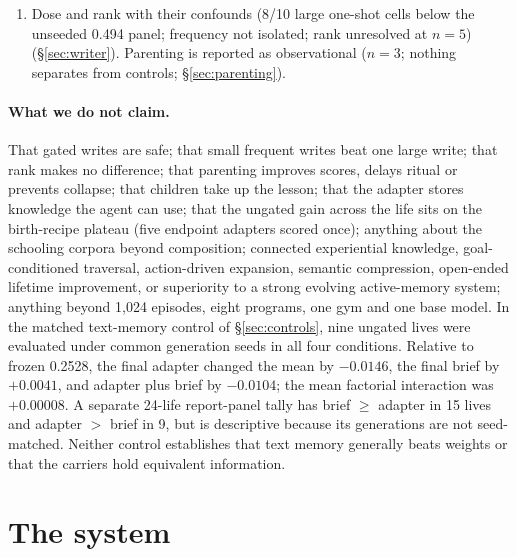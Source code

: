 \documentclass{article}
\begin{document}
\begin{enumerate}
\item Dose and rank with their confounds (8/10 large one-shot cells below the unseeded 0.494 panel; frequency not isolated; rank unresolved at $n = 5$) (\S\ref{sec:writer}). Parenting is reported as observational ($n = 3$; nothing separates from controls; \S\ref{sec:parenting}).
\end{enumerate}

\paragraph{What we do not claim.} That gated writes are safe; that small frequent writes beat one large write; that rank makes no difference; that parenting improves scores, delays ritual or prevents collapse; that children take up the lesson; that the adapter stores knowledge the agent can use; that the ungated gain across the life sits on the birth-recipe plateau (five endpoint adapters scored once); anything about the schooling corpora beyond composition; connected experiential knowledge, goal-conditioned traversal, action-driven expansion, semantic compression, open-ended lifetime improvement, or superiority to a strong evolving active-memory system; anything beyond 1{,}024 episodes, eight programs, one gym and one base model.
In the matched text-memory control of \S\ref{sec:controls}, nine ungated lives were evaluated under common generation seeds in all four conditions. Relative to frozen 0.2528, the final adapter changed the mean by $-0.0146$, the final brief by $+0.0041$, and adapter plus brief by $-0.0104$; the mean factorial interaction was $+0.00008$. A separate 24-life report-panel tally has brief $\ge$ adapter in 15 lives and adapter $>$ brief in 9, but is descriptive because its generations are not seed-matched. Neither control establishes that text memory generally beats weights or that the carriers hold equivalent information.

\section{The system}
\label{sec:system}
\end{document}
